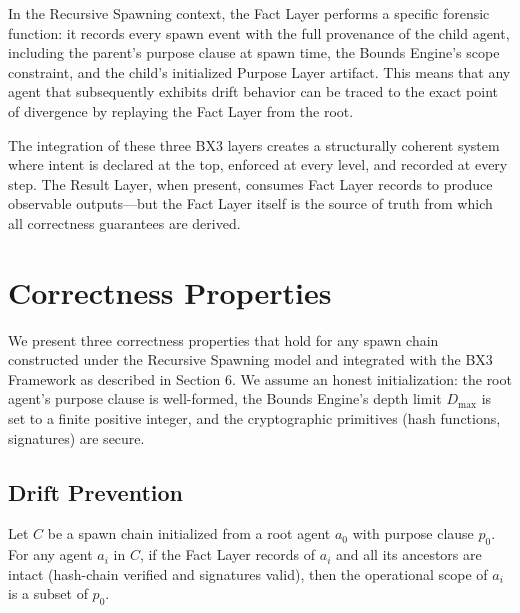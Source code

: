 In the Recursive Spawning context, the Fact Layer performs a specific forensic function: it records every spawn event with the full provenance of the child agent, including the parent's purpose clause at spawn time, the Bounds Engine's scope constraint, and the child's initialized Purpose Layer artifact. This means that any agent that subsequently exhibits drift behavior can be traced to the exact point of divergence by replaying the Fact Layer from the root.

The integration of these three BX3 layers creates a structurally coherent system where intent is declared at the top, enforced at every level, and recorded at every step. The Result Layer, when present, consumes Fact Layer records to produce observable outputs—but the Fact Layer itself is the source of truth from which all correctness guarantees are derived.

\newpage

\section{Correctness Properties}

We present three correctness properties that hold for any spawn chain constructed under the Recursive Spawning model and integrated with the BX3 Framework as described in Section 6. We assume an honest initialization: the root agent's purpose clause is well-formed, the Bounds Engine's depth limit $D_{\max}$ is set to a finite positive integer, and the cryptographic primitives (hash functions, signatures) are secure.

\subsection{Drift Prevention}

\begin{prop}\label{prop:drift_prevention}
Let $C$ be a spawn chain initialized from a root agent $a_0$ with purpose clause $p_0$. For any agent $a_i$ in $C$, if the Fact Layer records of $a_i$ and all its ancestors are intact (hash-chain verified and signatures valid), then the operational scope of $a_i$ is a subset of $p_0$.
\end{prop}

